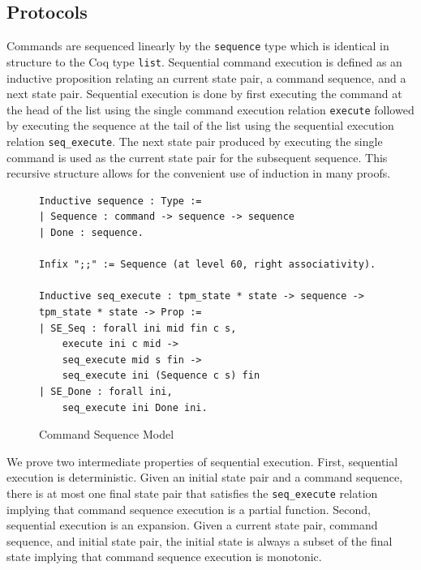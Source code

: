 \documentclass[runningheads]{llncs}
\begin{document}

\subsection{Protocols}

Commands are sequenced linearly by the \verb|sequence| type which is
identical in structure to the Coq type \verb|list|. Sequential command
execution is defined as an inductive proposition relating an current
state pair, a command sequence, and a next state pair. Sequential
execution is done by first executing the command at the head of the
list using the single command execution relation \verb|execute|
followed by executing the sequence at the tail of the list using the
sequential execution relation \verb|seq_execute|. The next state pair
produced by executing the single command is used as the current state
pair for the subsequent sequence. This recursive structure allows for
the convenient use of induction in many proofs.

\begin{figure}[hbtp]
\begin{lstlisting}[language=Coq]
Inductive sequence : Type :=
| Sequence : command -> sequence -> sequence
| Done : sequence.

Infix ";;" := Sequence (at level 60, right associativity).

Inductive seq_execute : tpm_state * state -> sequence -> tpm_state * state -> Prop :=
| SE_Seq : forall ini mid fin c s,
    execute ini c mid ->
    seq_execute mid s fin ->
    seq_execute ini (Sequence c s) fin
| SE_Done : forall ini,
    seq_execute ini Done ini.
\end{lstlisting}
\caption{Command Sequence Model}
\label{fig:command-sequence-model}
\end{figure}

We prove two intermediate properties of sequential execution. First,
sequential execution is deterministic. Given an initial state pair and
a command sequence, there is at most one final state pair that
satisfies the \verb|seq_execute| relation implying that command
sequence execution is a partial function. Second, sequential execution
is an expansion. Given a current state pair, command sequence, and
initial state pair, the initial state is always a subset of the final
state implying that command sequence execution is monotonic.
\end{document}
